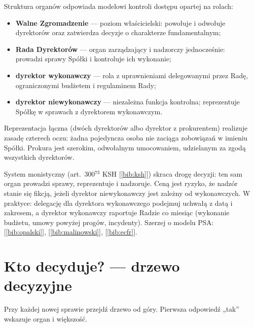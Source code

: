 \documentclass[11pt,a4paper]{report}
\newcommand{\Zr}[1]{[\ref{bib:#1}]}
\begin{document}
\begin{OCoChodzi}
Struktura organów odpowiada modelowi kontroli dostępu opartej na rolach:
\begin{itemize}
  \item \textbf{Walne Zgromadzenie} --- poziom właścicielski: powołuje i odwołuje dyrektorów oraz zatwierdza decyzje o charakterze fundamentalnym;
  \item \textbf{Rada Dyrektorów} --- organ zarządzający i nadzorczy jednocześnie: prowadzi sprawy Spółki i kontroluje ich wykonanie;
  \item \textbf{dyrektor wykonawczy} --- rola z uprawnieniami delegowanymi przez Radę, ograniczonymi budżetem i regulaminem Rady;
  \item \textbf{dyrektor niewykonawczy} --- niezależna funkcja kontrolna; reprezentuje Spółkę w sprawach z dyrektorem wykonawczym.
\end{itemize}
Reprezentacja łączna (dwóch dyrektorów albo dyrektor z prokurentem) realizuje zasadę czterech oczu: żadna pojedyncza osoba nie zaciąga zobowiązań w imieniu Spółki. Prokura jest szerokim, odwołalnym umocowaniem, udzielanym za zgodą wszystkich dyrektorów.
\end{OCoChodzi}

\begin{Komentarz}
System monistyczny (art.~300$^{73}$ KSH \Zr{ksh}) skraca drogę decyzji: ten sam organ prowadzi sprawy, reprezentuje i nadzoruje. Ceną jest ryzyko, że nadzór stanie się fikcją, jeżeli dyrektor niewykonawczy jest zależny od wykonawczych. W praktyce: delegację dla dyrektora wykonawczego podejmuj uchwałą z datą i zakresem, a dyrektor wykonawczy raportuje Radzie co miesiąc (wykonanie budżetu, umowy powyżej progów, incydenty). Szerzej o modelu PSA: \Zr{opalski}, \Zr{malinowski}, \Zr{ecfr}.
\end{Komentarz}

\section{Kto decyduje? --- drzewo decyzyjne}

Przy każdej nowej sprawie przejdź drzewo od góry. Pierwsza odpowiedź „tak” wskazuje organ i większość.
\end{document}
